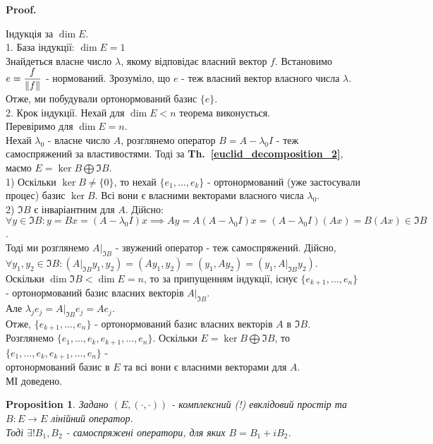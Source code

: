 \documentclass[a4paper, 10pt]{article}
\makeatletter
\theoremstyle{theoremdd}
\newtheorem{proposition}[theorem]{Proposition}
\newcommand\thref[1]{\textbf{Th.~\ref{#1}}}
\renewenvironment{proof}[1][Proof.\\]{\par
\pushQED{\hfill \qed}%
\normalfont \topsep6\p@\@plus6\p@\relax
\trivlist
\item\relax
{\bfseries
#1\@addpunct{.}}\hspace\labelsep\ignorespaces
}{%
\popQED\endtrivlist\@endpefalse
}
\makeatother
\begin{document}
\begin{proof}
Індукція за $\dim E$.\\
1. База індукції: $\dim E = 1$\\
Знайдеться власне число $\lambda$, якому відповідає власний вектор $f$. Встановимо $e = \dfrac{f}{\norm{f}}$ - нормований. Зрозуміло, що $e$ - теж власний вектор власного числа $\lambda$.\\
Отже, ми побудували ортонормований базис $\{e\}$.
\bigskip \\
2. Крок індукції. Нехай для $\dim E < n$ теорема виконується.\\
Перевіримо для $\dim E = n$.\\
Нехай $\lambda_0$ - власне число $A$, розглянемо оператор $B = A - \lambda_0 I$ - теж самоспряжений за властивостями. Тоді за \thref{euclid_decomposition_2}, маємо $E = \ker B \bigoplus \Im B$.\\
1) Оскільки $\ker B \neq \{0\}$, то нехай $\{e_1,\dots,e_k\}$ - ортонормований (уже застосували процес) базис $\ker B$. Всі вони є власними векторами власного числа $\lambda_0$.\\
2) $\Im B$ є інваріантним для $A$. Дійсно:\\
$\forall y \in \Im B: y = Bx = (A-\lambda_0 I)x \implies Ay = A(A-\lambda_0 I)x = (A-\lambda_0 I)(Ax) = B(Ax) \in \Im B$.\\
Тоді ми розглянемо  $A|_{\Im B}$ - звужений оператор - теж самоспряжений. Дійсно,\\
$\forall y_1,y_2 \in \Im B: (A|_{\Im B} y_1, y_2) = (Ay_1, y_2) = (y_1, Ay_2) = (y_1, A|_{\Im B} y_2)$.\\
Оскільки $\dim \Im B < \dim E = n$, то за припущенням індукції, існує $\{e_{k+1},\dots,e_n\}$ - ортонормований базис власних векторів $A|_{\Im B}$.\\
Але $\lambda_j e_j = A|_{\Im B} e_j = Ae_j$.\\
Отже, $\{e_{k+1},\dots,e_n\}$ - ортонормований базис власних векторів $A$ в $\Im B$.\\
Розглянемо $\{e_1,\dots,e_k,e_{k+1},\dots,e_n\}$. Оскільки $E = \ker B \bigoplus \Im B$, то $\{e_1,\dots,e_k,e_{k+1},\dots,e_n\}$ - \\ ортонормований базис в $E$ та всі вони є власними векторами для $A$.\\
МІ доведено.
\end{proof}

\begin{proposition}
Задано $(E,(\cdot,\cdot))$ - комплексний (!) евклідовий простір та $B: E \to E$ лінійний оператор.\\
Тоді $\exists! B_1,B_2$ - самоспряжені оператори, для яких $B = B_1 + i B_2$.
\end{proposition}
\end{document}
